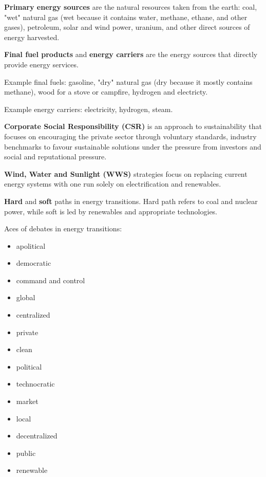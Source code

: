 \textbf{Primary energy sources} are the natural resources taken from the earth:
coal, "wet" natural gas (wet because it contains water, methane, ethane, and
other gases), petroleum, solar and wind power, uranium, and other direct
sources of energy harvested.

\textbf{Final fuel products} and \textbf{energy carriers} are the energy
sources that directly provide energy services.

Example final fuels: gasoline, "dry" natural gas (dry because it mostly
contains methane), wood for a stove or campfire, hydrogen and electricty.

Example energy carriers: electricity, hydrogen, steam.

\textbf{Corporate Social Responsibility (CSR)} is an approach to sustainability
that focuses on encouraging the private sector through voluntary standards,
industry benchmarks to favour sustainable solutions under the pressure from
investors and social and reputational pressure.

\textbf{Wind, Water and Sunlight (WWS)} strategies focus on replacing current
energy systems with one run solely on electrification and renewables.

\textbf{Hard} and \textbf{soft} paths in energy transitions. Hard path refers
to coal and nuclear power, while soft is led by renewables and appropriate
technologies.

Aces of debates in energy transitions:

\begin{itemize}
	\item apolitical
	\item democratic
	\item command and control
	\item global
	\item centralized
	\item private
	\item clean
	\item political
	\item technocratic
	\item market
	\item local
	\item decentralized
	\item public
	\item renewable
\end{itemize}
